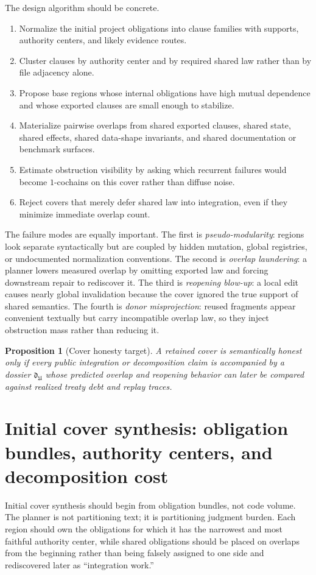 \documentclass[11pt]{report}
\newtheorem{proposition}[definition]{Proposition}
\begin{document}
The design algorithm should be concrete.
\begin{enumerate}
\item Normalize the initial project obligations into clause families with supports, authority centers, and likely evidence routes.
\item Cluster clauses by authority center and by required shared law rather than by file adjacency alone.
\item Propose base regions whose internal obligations have high mutual dependence and whose exported clauses are small enough to stabilize.
\item Materialize pairwise overlaps from shared exported clauses, shared state, shared effects, shared data-shape invariants, and shared documentation or benchmark surfaces.
\item Estimate obstruction visibility by asking which recurrent failures would become $1$-cochains on this cover rather than diffuse noise.
\item Reject covers that merely defer shared law into integration, even if they minimize immediate overlap count.
\end{enumerate}

The failure modes are equally important. The first is \emph{pseudo-modularity}: regions look separate syntactically but are coupled by hidden mutation, global registries, or undocumented normalization conventions. The second is \emph{overlap laundering}: a planner lowers measured overlap by omitting exported law and forcing downstream repair to rediscover it. The third is \emph{reopening blow-up}: a local edit causes nearly global invalidation because the cover ignored the true support of shared semantics. The fourth is \emph{donor misprojection}: reused fragments appear convenient textually but carry incompatible overlap law, so they inject obstruction mass rather than reducing it.

\begin{proposition}[Cover honesty target]
A retained cover is semantically honest only if every public integration or decomposition claim is accompanied by a dossier $\mathfrak{d}_{\mathfrak{U}}$ whose predicted overlap and reopening behavior can later be compared against realized treaty debt and replay traces.
\end{proposition}

\section{Initial cover synthesis: obligation bundles, authority centers, and decomposition cost}
Initial cover synthesis should begin from obligation bundles, not code volume. The planner is not partitioning text; it is partitioning judgment burden. Each region should own the obligations for which it has the narrowest and most faithful authority center, while shared obligations should be placed on overlaps from the beginning rather than being falsely assigned to one side and rediscovered later as ``integration work.''
\end{document}
